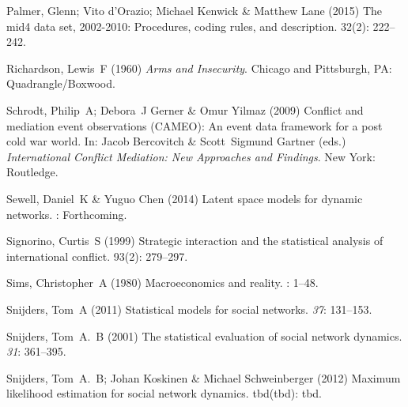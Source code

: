 \documentclass[3p,times,twocolumn,authoryear,12pt]{elsarticle}
\begin{document}
\begin{thebibliography}{}
Palmer, Glenn; Vito d'Orazio; Michael Kenwick  \& Matthew Lane (2015) The mid4
  data set, 2002-2010: Procedures, coding rules, and description.
 { 32\/}(2): 222--242.

Richardson, Lewis~F (1960) {\em Arms and Insecurity}.
\newblock Chicago and Pittsburgh, PA: Quadrangle/Boxwood.

Schrodt, Philip~A; Debora~J Gerner  \& Omur Yilmaz (2009) Conflict and
  mediation event observations (CAMEO): An event data framework for a post cold
  war world.
\newblock In: Jacob Bercovitch \& Scott~Sigmund Gartner (eds.) {\em
  International Conflict Mediation: New Approaches and Findings}. New York:
  Routledge.

Sewell, Daniel~K  \& Yuguo Chen (2014) Latent space models for dynamic
  networks.
: Forthcoming.

Signorino, Curtis~S (1999) Strategic interaction and the statistical analysis
  of international conflict.
 { 93\/}(2): 279--297.

Sims, Christopher~A (1980) Macroeconomics and reality.
: 1--48.

Snijders, Tom~A (2011) Statistical models for social networks.
 {\em 37}: 131--153.

Snijders, Tom~A.~B (2001) The statistical evaluation of social network
  dynamics.
 {\em 31}: 361--395.

Snijders, Tom~A.~B; Johan Koskinen  \& Michael Schweinberger (2012) Maximum
  likelihood estimation for social network dynamics.
 { tbd\/}(tbd): tbd.


\end{thebibliography}
\end{document}
